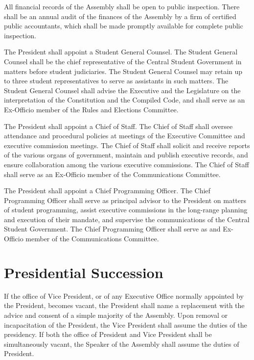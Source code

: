     All financial records of the Assembly shall be open to public inspection. There shall be an annual audit of the finances of the Assembly by a firm of certified public accountants, which shall be made promptly available for complete public inspection. 

    The President shall appoint a Student General Counsel. The Student General Counsel shall be the chief representative of the Central Student Government in matters before student judiciaries. The Student General Counsel may retain up to three student representatives to serve as assistants in such matters. The Student General Counsel shall advise the Executive and the Legislature on the interpretation of the Constitution and the Compiled Code, and shall serve as an Ex-Officio member of the Rules and Elections Committee.
    
    The President shall appoint a Chief of Staff. The Chief of Staff shall oversee attendance and procedural policies at meetings of the Executive Committee and executive commission meetings. The Chief of Staff shall solicit and receive reports of the various organs of government, maintain and publish executive records, and ensure collaboration among the various executive commissions. The Chief of Staff shall serve as an Ex-Officio member of the Communications Committee.

    The President shall appoint a Chief Programming Officer. The Chief Programming Officer shall serve as principal advisor to the President on matters of student programming, assist executive commissions in the long-range planning and execution of their mandate, and supervise the communications of the Central Student Government. The Chief Programming Officer shall serve as and Ex-Officio member of the Communications Committee.

\section{Presidential Succession}
    If the office of Vice President, or of any Executive Office normally appointed by the President, becomes vacant, the President shall name a replacement with the advice and consent of a simple majority of the Assembly. Upon removal or incapacitation of the President, the Vice President shall assume the duties of the presidency. If both the office of President and Vice President shall be simultaneously vacant, the Speaker of the Assembly shall assume the duties of President.
